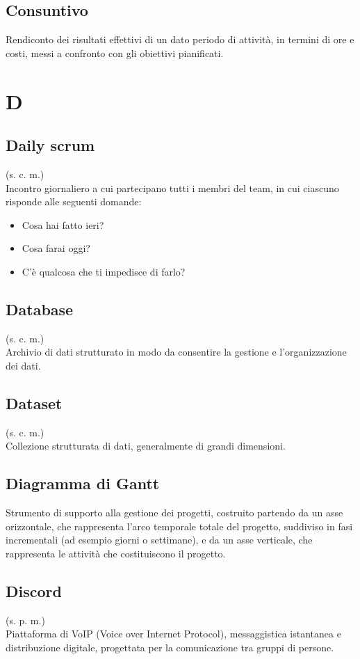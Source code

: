     \subsection{Consuntivo}
    Rendiconto dei risultati effettivi di un dato periodo di attività, 
    in termini di ore e costi, messi a confronto con gli obiettivi pianificati.
\pagebreak
\section{D}
    \subsection{Daily scrum}
    (s. c. m.)\\
    Incontro giornaliero a cui partecipano tutti i membri del team, in cui ciascuno
    risponde alle seguenti domande:
    \begin{itemize}
        \item Cosa hai fatto ieri?
        \item Cosa farai oggi?
        \item C'è qualcosa che ti impedisce di farlo?
    \end{itemize}
    \subsection{Database}
    (s. c. m.)\\
    Archivio di dati strutturato in modo da consentire la gestione e 
    l'organizzazione dei dati.
    \subsection{Dataset}
    (s. c. m.)\\
    Collezione strutturata di dati, generalmente di grandi dimensioni.
    \subsection{Diagramma di Gantt}
    Strumento di supporto alla gestione dei progetti, costruito partendo da 
    un asse orizzontale, che rappresenta l'arco temporale totale del progetto, 
    suddiviso in fasi incrementali (ad esempio giorni o settimane), e da un asse 
    verticale, che rappresenta le attività che costituiscono il progetto.
    \subsection{Discord}
    (s. p. m.)\\
    Piattaforma di VoIP (Voice over Internet Protocol), messaggistica istantanea 
    e distribuzione digitale, progettata per la comunicazione tra gruppi di persone.
